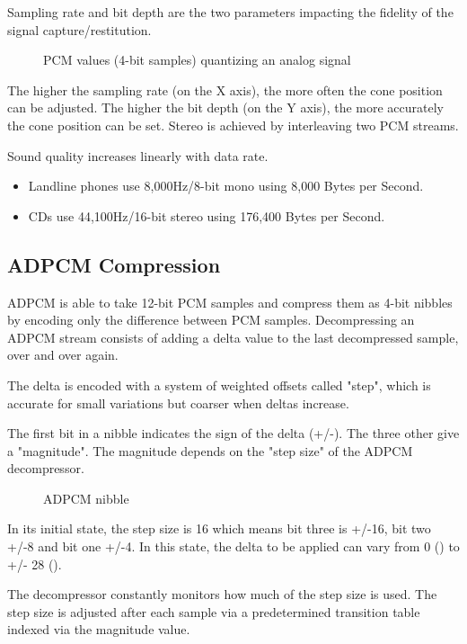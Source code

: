 Sampling rate and bit depth are the two parameters impacting the fidelity of the signal capture/restitution.

\begin{figure}[H]
\caption*{PCM values (4-bit samples) quantizing an analog signal}
\end{figure}


The higher the sampling rate (on the X axis), the more often the cone position can be adjusted. The higher the bit depth (on the Y axis), the more accurately the cone position can be set. Stereo is achieved by interleaving two PCM streams.





Sound quality increases linearly with data rate.
\begin{itemize}[topsep=0pt]
\item Landline phones use 8,000Hz/8-bit mono using 8,000 Bytes per Second.
\item CDs use 44,100Hz/16-bit stereo using 176,400 Bytes per Second.
\end{itemize}



\subsection{ADPCM Compression}
ADPCM is able to take 12-bit PCM samples and compress them as 4-bit nibbles by encoding only the difference between PCM samples. Decompressing an ADPCM stream consists of adding a delta value to the last decompressed  sample, over and over again.

The delta is encoded with a system of weighted offsets called "step", which is accurate for small variations but coarser when deltas increase. 

The first bit in a nibble indicates the sign of the delta (+/-). The three other give a "magnitude". The magnitude depends on the "step size" of the ADPCM decompressor.

\begin{figure}[H]
\caption*{ADPCM nibble}
\end{figure}


In its initial state, the step size is 16 which means bit three is +/-16, bit two +/-8 and bit one +/-4. In this state, the delta to be applied can vary from 0 () to +/- 28 (). 

The decompressor constantly monitors how much of the step size is used. The step size is adjusted after each sample via a  predetermined transition table indexed via the magnitude value. 

